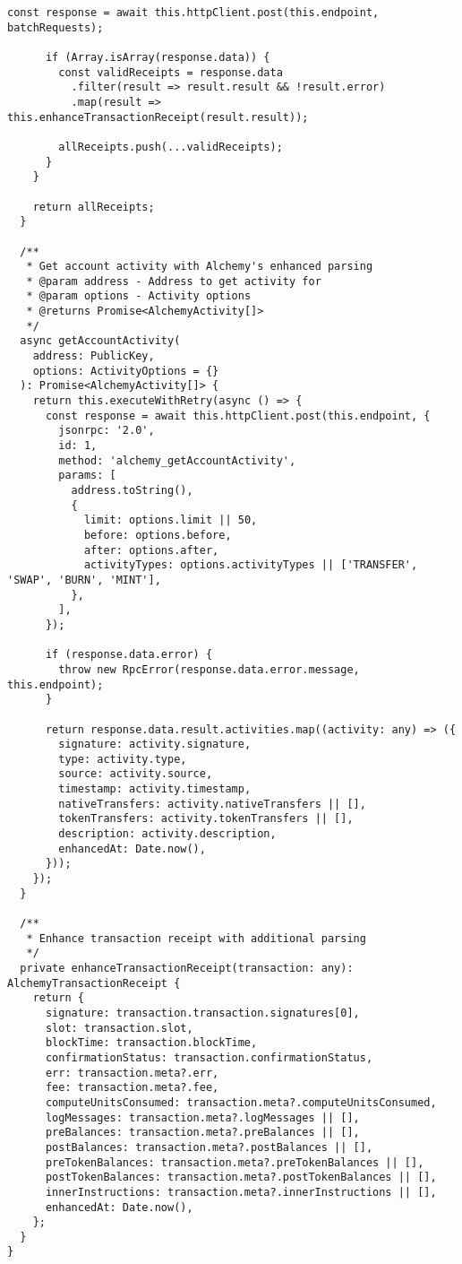 \documentclass[11pt,a4paper]{article}
\begin{document}
\begin{lstlisting}[style=typescript, caption=Alchemy Service Implementation]
      const response = await this.httpClient.post(this.endpoint, batchRequests);
      
      if (Array.isArray(response.data)) {
        const validReceipts = response.data
          .filter(result => result.result && !result.error)
          .map(result => this.enhanceTransactionReceipt(result.result));
        
        allReceipts.push(...validReceipts);
      }
    }

    return allReceipts;
  }

  /**
   * Get account activity with Alchemy's enhanced parsing
   * @param address - Address to get activity for
   * @param options - Activity options
   * @returns Promise<AlchemyActivity[]>
   */
  async getAccountActivity(
    address: PublicKey,
    options: ActivityOptions = {}
  ): Promise<AlchemyActivity[]> {
    return this.executeWithRetry(async () => {
      const response = await this.httpClient.post(this.endpoint, {
        jsonrpc: '2.0',
        id: 1,
        method: 'alchemy_getAccountActivity',
        params: [
          address.toString(),
          {
            limit: options.limit || 50,
            before: options.before,
            after: options.after,
            activityTypes: options.activityTypes || ['TRANSFER', 'SWAP', 'BURN', 'MINT'],
          },
        ],
      });

      if (response.data.error) {
        throw new RpcError(response.data.error.message, this.endpoint);
      }

      return response.data.result.activities.map((activity: any) => ({
        signature: activity.signature,
        type: activity.type,
        source: activity.source,
        timestamp: activity.timestamp,
        nativeTransfers: activity.nativeTransfers || [],
        tokenTransfers: activity.tokenTransfers || [],
        description: activity.description,
        enhancedAt: Date.now(),
      }));
    });
  }

  /**
   * Enhance transaction receipt with additional parsing
   */
  private enhanceTransactionReceipt(transaction: any): AlchemyTransactionReceipt {
    return {
      signature: transaction.transaction.signatures[0],
      slot: transaction.slot,
      blockTime: transaction.blockTime,
      confirmationStatus: transaction.confirmationStatus,
      err: transaction.meta?.err,
      fee: transaction.meta?.fee,
      computeUnitsConsumed: transaction.meta?.computeUnitsConsumed,
      logMessages: transaction.meta?.logMessages || [],
      preBalances: transaction.meta?.preBalances || [],
      postBalances: transaction.meta?.postBalances || [],
      preTokenBalances: transaction.meta?.preTokenBalances || [],
      postTokenBalances: transaction.meta?.postTokenBalances || [],
      innerInstructions: transaction.meta?.innerInstructions || [],
      enhancedAt: Date.now(),
    };
  }
}
\end{lstlisting}
\end{document}
